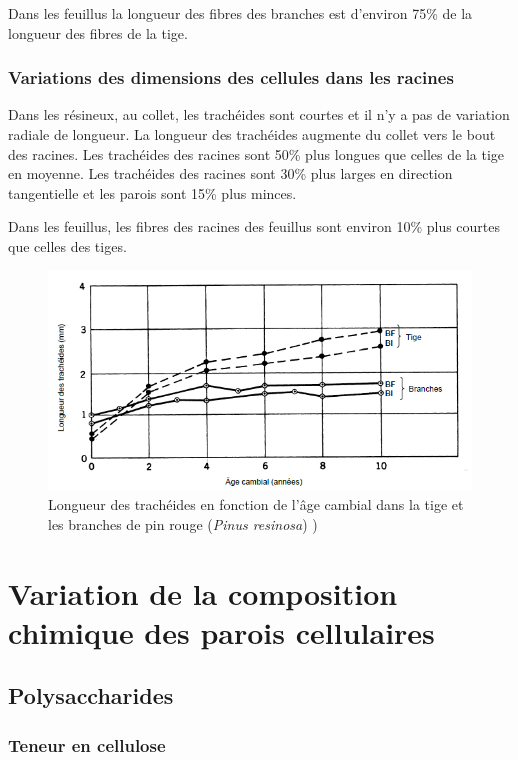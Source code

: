 Dans les feuillus la longueur des fibres des branches est d'environ 75\% de la longueur des fibres de la tige.

\subsubsection{Variations des dimensions des cellules dans les racines}

Dans les résineux, au collet, les trachéides sont courtes et il n'y a pas de variation radiale de longueur. La longueur des trachéides augmente du collet vers le bout des racines. Les trachéides des racines sont 50\% plus longues que celles de la tige en moyenne. Les trachéides des racines sont 30\% plus larges en direction tangentielle et les parois sont 15\% plus minces.

Dans les feuillus, les fibres des racines des feuillus sont environ 10\% plus courtes que celles des tiges.

\begin{figure}[h]
	\centering
	\includegraphics[scale=0.7]{img/ch7_long_tige_branches}
	\caption{Longueur des trachéides en fonction de l'âge cambial dans la tige et les branches de pin rouge (\textit{Pinus resinosa}) \cite{panshin1980textbook})}
	\label{fig:long_tige_branches}
\end{figure}

\section{Variation de la composition chimique des parois cellulaires}

\subsection{Polysaccharides}

\subsubsection{Teneur en cellulose}

